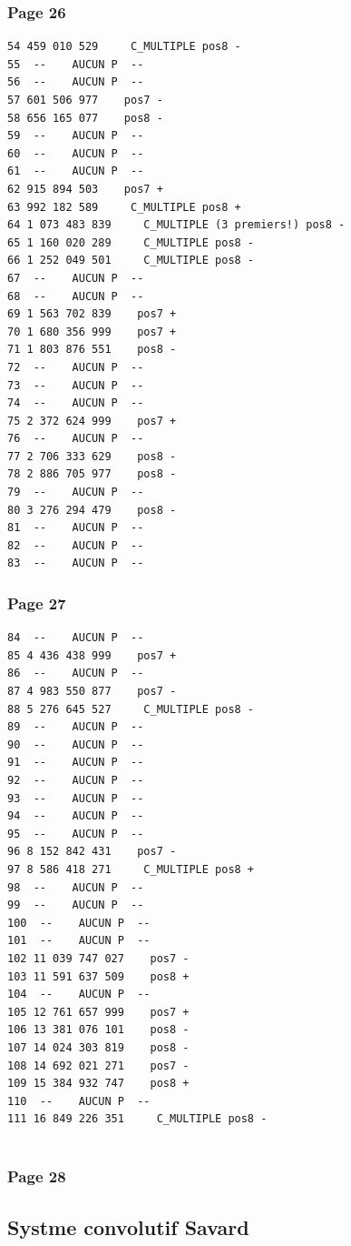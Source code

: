 \documentclass[11pt,a4paper]{article}
\begin{document}
\subsubsection*{Page 26}
\begin{Verbatim}[fontsize=\footnotesize]
54 459 010 529     C_MULTIPLE pos8 - 
55  --    AUCUN P  --  
56  --    AUCUN P  --  
57 601 506 977    pos7 - 
58 656 165 077    pos8 - 
59  --    AUCUN P  --  
60  --    AUCUN P  --  
61  --    AUCUN P  --  
62 915 894 503    pos7 + 
63 992 182 589     C_MULTIPLE pos8 + 
64 1 073 483 839     C_MULTIPLE (3 premiers!) pos8 - 
65 1 160 020 289     C_MULTIPLE pos8 - 
66 1 252 049 501     C_MULTIPLE pos8 - 
67  --    AUCUN P  --  
68  --    AUCUN P  --  
69 1 563 702 839    pos7 + 
70 1 680 356 999    pos7 + 
71 1 803 876 551    pos8 - 
72  --    AUCUN P  --  
73  --    AUCUN P  --  
74  --    AUCUN P  --  
75 2 372 624 999    pos7 + 
76  --    AUCUN P  --  
77 2 706 333 629    pos8 - 
78 2 886 705 977    pos8 - 
79  --    AUCUN P  --  
80 3 276 294 479    pos8 - 
81  --    AUCUN P  --  
82  --    AUCUN P  --  
83  --    AUCUN P  --  
\end{Verbatim}
\medskip
\subsubsection*{Page 27}
\begin{Verbatim}[fontsize=\footnotesize]
84  --    AUCUN P  --  
85 4 436 438 999    pos7 + 
86  --    AUCUN P  --  
87 4 983 550 877    pos7 - 
88 5 276 645 527     C_MULTIPLE pos8 - 
89  --    AUCUN P  --  
90  --    AUCUN P  --  
91  --    AUCUN P  --  
92  --    AUCUN P  --  
93  --    AUCUN P  --  
94  --    AUCUN P  --  
95  --    AUCUN P  --  
96 8 152 842 431    pos7 - 
97 8 586 418 271     C_MULTIPLE pos8 + 
98  --    AUCUN P  --  
99  --    AUCUN P  --  
100  --    AUCUN P  --  
101  --    AUCUN P  --  
102 11 039 747 027    pos7 - 
103 11 591 637 509    pos8 + 
104  --    AUCUN P  --  
105 12 761 657 999    pos7 + 
106 13 381 076 101    pos8 - 
107 14 024 303 819    pos8 - 
108 14 692 021 271    pos7 - 
109 15 384 932 747    pos8 + 
110  --    AUCUN P  --  
111 16 849 226 351     C_MULTIPLE pos8 - 
 
\end{Verbatim}
\medskip
\subsubsection*{Page 28}
\subsection*{Systme convolutif Savard}
\end{document}
